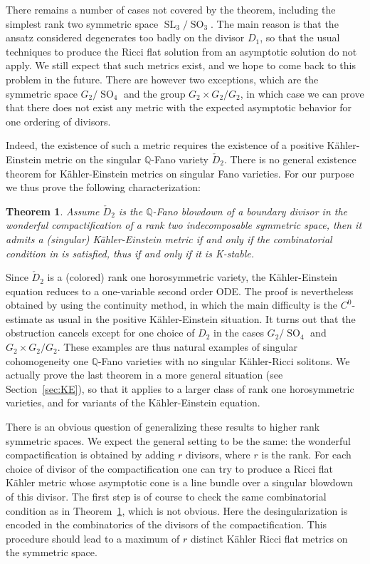 \documentclass[10pt]{amsart}
\theoremstyle{plain}
\newtheorem{thm}{Theorem}[section]
\theoremstyle{definition}
\DeclareMathOperator{\SL}{SL}
\DeclareMathOperator{\SO}{SO}
\begin{document}
There remains a number of cases not covered by the theorem, including the simplest
rank two symmetric space $\SL_3/\SO_3$. The main reason is that the ansatz considered
degenerates too badly on the divisor $D_1$, so that the usual techniques to produce
the Ricci flat solution from an asymptotic solution do not apply. We still expect
that such metrics exist, and we hope to come back to this problem in the future. There are however two exceptions, which are the symmetric
space $G_2/\SO_4$ and the group $G_2\times G_2/G_2$, in which case we can prove that
there does not exist any metric with the expected asymptotic behavior for one ordering
of divisors.

Indeed, the existence of such a metric requires the existence of a positive Kähler-Einstein
metric on the singular $\mathbb{Q}$-Fano variety $\check{D}_2$. There is no general existence
theorem for Kähler-Einstein metrics on singular Fano varieties.
For our purpose we thus prove the following characterization:


\begin{thm}\label{th:2}
Assume $\check{D}_2$ is the $\mathbb{Q}$-Fano blowdown of a boundary divisor in the
wonderful compactification of a rank two indecomposable symmetric space, then
it admits a (singular) Kähler-Einstein metric if and only if the combinatorial
condition in \cite{DelKSSV} is satisfied, thus if and only if it is K-stable.
\end{thm}


Since $\check{D}_2$ is a (colored) rank one horosymmetric variety,
the Kähler-Einstein equation reduces to a one-variable second order ODE.
The proof is nevertheless obtained by using the continuity method,
in which the main difficulty is the $C^0$-estimate as usual in the positive
Kähler-Einstein situation.
It turns out that the obstruction cancels except for one choice of $D_2$ in the
cases $G_2/\SO_4$ and $G_2\times G_2/G_2$. These examples are thus natural examples
of singular cohomogeneity one $\mathbb{Q}$-Fano varieties with no singular Kähler-Ricci
solitons.
We actually prove the last theorem in a more general situation (see Section~\ref{sec:KE}),
so that it applies to a larger class of rank one horosymmetric varieties,
and for variants of the Kähler-Einstein equation.

There is an obvious question of generalizing these results to higher rank symmetric spaces. We expect the general setting to be the same: the wonderful compactification is obtained by adding $r$ divisors, where $r$ is the rank. For each choice of divisor of the compactification one can try to produce a Ricci flat Kähler metric whose asymptotic cone is a line bundle over a singular blowdown of this divisor. The first step is of course to check the same combinatorial condition as in Theorem~\ref{th:2}, which is not obvious. Here the desingularization is encoded in the combinatorics of the divisors of the compactification. This procedure should lead to a maximum of $r$ distinct Kähler Ricci flat metrics on the symmetric space.
\end{document}
